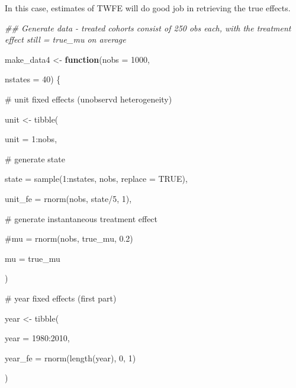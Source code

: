 \documentclass[
  letterpaper,
  DIV=11,
  numbers=noendperiod]{scrartcl}
\newenvironment{Shaded}{\begin{snugshade}}{\end{snugshade}}
\newcommand{\AttributeTok}[1]{\textcolor[rgb]{0.40,0.45,0.13}{#1}}
\newcommand{\CommentTok}[1]{\textcolor[rgb]{0.37,0.37,0.37}{#1}}
\newcommand{\ConstantTok}[1]{\textcolor[rgb]{0.56,0.35,0.01}{#1}}
\newcommand{\ControlFlowTok}[1]{\textcolor[rgb]{0.00,0.23,0.31}{\textbf{#1}}}
\newcommand{\DecValTok}[1]{\textcolor[rgb]{0.68,0.00,0.00}{#1}}
\newcommand{\DocumentationTok}[1]{\textcolor[rgb]{0.37,0.37,0.37}{\textit{#1}}}
\newcommand{\FunctionTok}[1]{\textcolor[rgb]{0.28,0.35,0.67}{#1}}
\newcommand{\NormalTok}[1]{\textcolor[rgb]{0.00,0.23,0.31}{#1}}
\newcommand{\OtherTok}[1]{\textcolor[rgb]{0.00,0.23,0.31}{#1}}
\newcommand{\SpecialCharTok}[1]{\textcolor[rgb]{0.37,0.37,0.37}{#1}}
\begin{document}
In this case, estimates of TWFE will do good job in retrieving the true
effects.

\begin{Shaded}
\begin{Highlighting}[]
\DocumentationTok{\#\# Generate data {-} treated cohorts consist of 250 obs each, with the treatment effect still = true\_mu on average}

\NormalTok{make\_data4 }\OtherTok{\textless{}{-}} \ControlFlowTok{function}\NormalTok{(}\AttributeTok{nobs =} \DecValTok{1000}\NormalTok{,}

                       \AttributeTok{nstates =} \DecValTok{40}\NormalTok{) \{}

 

  \CommentTok{\# unit fixed effects (unobservd heterogeneity)}

\NormalTok{  unit }\OtherTok{\textless{}{-}} \FunctionTok{tibble}\NormalTok{(}

    \AttributeTok{unit =} \DecValTok{1}\SpecialCharTok{:}\NormalTok{nobs,}

    \CommentTok{\# generate state}

    \AttributeTok{state =} \FunctionTok{sample}\NormalTok{(}\DecValTok{1}\SpecialCharTok{:}\NormalTok{nstates, nobs, }\AttributeTok{replace =} \ConstantTok{TRUE}\NormalTok{),}

    \AttributeTok{unit\_fe =} \FunctionTok{rnorm}\NormalTok{(nobs, state}\SpecialCharTok{/}\DecValTok{5}\NormalTok{, }\DecValTok{1}\NormalTok{),}

    \CommentTok{\# generate instantaneous treatment effect}

    \CommentTok{\#mu = rnorm(nobs, true\_mu, 0.2)}

    \AttributeTok{mu =}\NormalTok{ true\_mu}

\NormalTok{  )}

 

  \CommentTok{\# year fixed effects (first part)}

\NormalTok{  year }\OtherTok{\textless{}{-}} \FunctionTok{tibble}\NormalTok{(}

    \AttributeTok{year =} \DecValTok{1980}\SpecialCharTok{:}\DecValTok{2010}\NormalTok{,}

    \AttributeTok{year\_fe =} \FunctionTok{rnorm}\NormalTok{(}\FunctionTok{length}\NormalTok{(year), }\DecValTok{0}\NormalTok{, }\DecValTok{1}\NormalTok{)}

\NormalTok{  )}

 


\end{Highlighting}
\end{Shaded}
\end{document}
